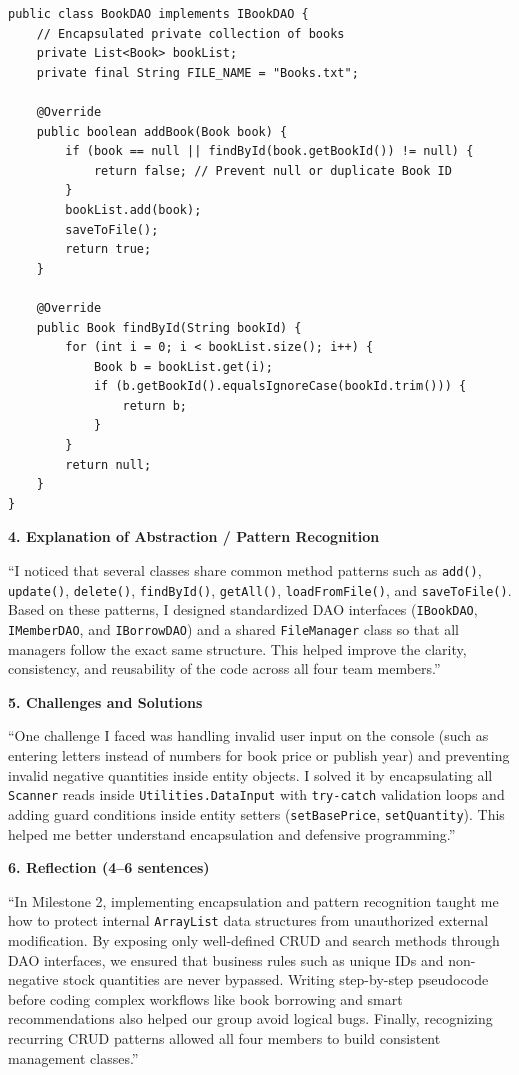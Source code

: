 \documentclass[12pt,a4paper]{article}
\begin{document}
\begin{lstlisting}[style=javastyle]
public class BookDAO implements IBookDAO {
    // Encapsulated private collection of books
    private List<Book> bookList;
    private final String FILE_NAME = "Books.txt";

    @Override
    public boolean addBook(Book book) {
        if (book == null || findById(book.getBookId()) != null) {
            return false; // Prevent null or duplicate Book ID
        }
        bookList.add(book);
        saveToFile();
        return true;
    }

    @Override
    public Book findById(String bookId) {
        for (int i = 0; i < bookList.size(); i++) {
            Book b = bookList.get(i);
            if (b.getBookId().equalsIgnoreCase(bookId.trim())) {
                return b;
            }
        }
        return null;
    }
}
\end{lstlisting}

\textbf{4. Explanation of Abstraction / Pattern Recognition}

``I noticed that several classes share common method patterns such as \texttt{add()}, \texttt{update()}, \texttt{delete()}, \texttt{findById()}, \texttt{getAll()}, \texttt{loadFromFile()}, and \texttt{saveToFile()}. Based on these patterns, I designed standardized DAO interfaces (\texttt{IBookDAO}, \texttt{IMemberDAO}, and \texttt{IBorrowDAO}) and a shared \texttt{FileManager} class so that all managers follow the exact same structure. This helped improve the clarity, consistency, and reusability of the code across all four team members.''

\textbf{5. Challenges and Solutions}

``One challenge I faced was handling invalid user input on the console (such as entering letters instead of numbers for book price or publish year) and preventing invalid negative quantities inside entity objects. I solved it by encapsulating all \texttt{Scanner} reads inside \texttt{Utilities.DataInput} with \texttt{try-catch} validation loops and adding guard conditions inside entity setters (\texttt{setBasePrice}, \texttt{setQuantity}). This helped me better understand encapsulation and defensive programming.''

\textbf{6. Reflection (4--6 sentences)}

``In Milestone 2, implementing encapsulation and pattern recognition taught me how to protect internal \texttt{ArrayList} data structures from unauthorized external modification. By exposing only well-defined CRUD and search methods through DAO interfaces, we ensured that business rules such as unique IDs and non-negative stock quantities are never bypassed. Writing step-by-step pseudocode before coding complex workflows like book borrowing and smart recommendations also helped our group avoid logical bugs. Finally, recognizing recurring CRUD patterns allowed all four members to build consistent management classes.''
\end{document}
